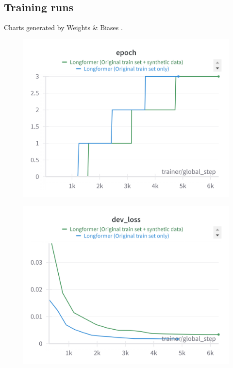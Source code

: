 \documentclass[11pt]{article}
\begin{document}
\subsection{Training runs}

Charts generated by Weights \& Biases \cite{wandb}.

\begin{figure}[H]
  \centering
  \includegraphics[width=\columnwidth]{images/epochs.png}
  \label{fig:epochs}
\end{figure}

\begin{figure}[H]
  \centering
  \includegraphics[width=\columnwidth]{images/dev_loss.png}
  \label{fig:dev_loss}
\end{figure}
\end{document}
